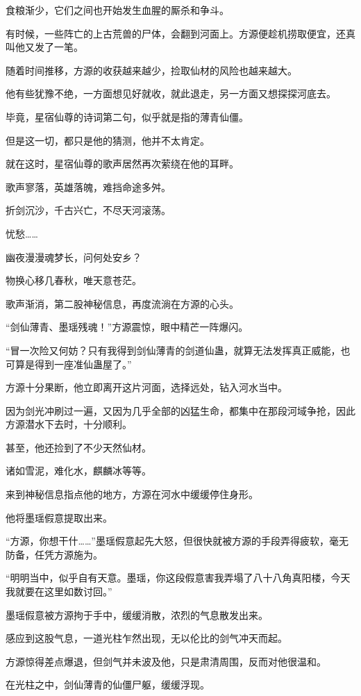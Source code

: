 \begin{this_body}
食粮渐少，它们之间也开始发生血腥的厮杀和争斗。

有时候，一些阵亡的上古荒兽的尸体，会翻到河面上。方源便趁机捞取便宜，还真叫他又发了一笔。

随着时间推移，方源的收获越来越少，捡取仙材的风险也越来越大。

他有些犹豫不绝，一方面想见好就收，就此退走，另一方面又想探探河底去。

毕竟，星宿仙尊的诗词第二句，似乎就是指的薄青仙僵。

但是这一切，都只是他的猜测，他并不太肯定。

就在这时，星宿仙尊的歌声居然再次萦绕在他的耳畔。

歌声寥落，英雄落魄，难挡命途多舛。

折剑沉沙，千古兴亡，不尽天河滚荡。

忧愁……

幽夜漫漫魂梦长，问何处安乡？

物换心移几春秋，唯天意苍茫。

歌声渐消，第二股神秘信息，再度流淌在方源的心头。

“剑仙薄青、墨瑶残魂！”方源震惊，眼中精芒一阵爆闪。

“冒一次险又何妨？只有我得到剑仙薄青的剑道仙蛊，就算无法发挥真正威能，也可算是得到一座准仙蛊屋了。”

方源十分果断，他立即离开这片河面，选择远处，钻入河水当中。

因为剑光冲刷过一遍，又因为几乎全部的凶猛生命，都集中在那段河域争抢，因此方源潜水下去时，十分顺利。

甚至，他还捡到了不少天然仙材。

诸如雪泥，难化水，麒麟冰等等。

来到神秘信息指点他的地方，方源在河水中缓缓停住身形。

他将墨瑶假意提取出来。

“方源，你想干什……”墨瑶假意起先大怒，但很快就被方源的手段弄得疲软，毫无防备，任凭方源施为。

“明明当中，似乎自有天意。墨瑶，你这段假意害我弄塌了八十八角真阳楼，今天我就要在这里如数讨回。”

墨瑶假意被方源拘于手中，缓缓消散，浓烈的气息散发出来。

感应到这股气息，一道光柱乍然出现，无以伦比的剑气冲天而起。

方源惊得差点爆退，但剑气并未波及他，只是肃清周围，反而对他很温和。

在光柱之中，剑仙薄青的仙僵尸躯，缓缓浮现。


\end{this_body}
